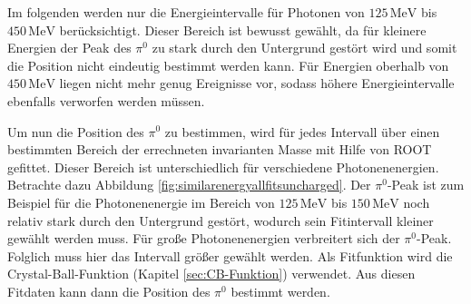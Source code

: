 \documentclass[a4paper,11pt,oneside,final,german,openbib,pdftex]{scrbook}
\begin{document}
{%
Im folgenden werden nur die Energieintervalle f\"ur Photonen von $125 \,\text{MeV}$ bis $450\, \text{MeV}$ ber\"ucksichtigt.
Dieser Bereich ist bewusst gew\"ahlt, da f\"ur kleinere Energien der Peak des $\pi^0$ zu stark durch den Untergrund gest\"ort wird und somit die Position nicht eindeutig bestimmt werden kann. F\"ur Energien oberhalb von $450\,\text{MeV}$ liegen nicht mehr genug Ereignisse vor, sodass h\"ohere Energieintervalle ebenfalls verworfen werden m\"ussen. 


Um nun die Position des $\pi^0$ zu bestimmen, wird für jedes Intervall über einen bestimmten Bereich der errechneten invarianten Masse mit Hilfe von ROOT gefittet. Dieser Bereich ist unterschiedlich f\"ur verschiedene Photonenenergien. Betrachte dazu Abbildung \ref{fig:similarenergyallfitsuncharged}. Der $\pi^0$-Peak ist zum Beispiel f\"ur die Photonenenergie im Bereich von $125\, \text{MeV}$ bis $150 \,\text{MeV}$ noch relativ stark durch den Untergrund gest\"ort, wodurch sein Fitintervall kleiner gew\"ahlt werden muss. F\"ur gro{\ss}e Photonenenergien verbreitert sich der $\pi^0$-Peak. Folglich muss hier das Intervall gr\"o{\ss}er gew\"ahlt werden. Als Fitfunktion wird die Crystal-Ball-Funktion (Kapitel \ref{sec:CB-Funktion}) verwendet. 
Aus diesen Fitdaten kann dann die Position des $\pi^0$ bestimmt werden.



  
 
%		
 
}
\end{document}
